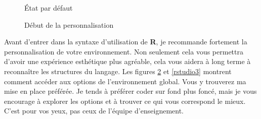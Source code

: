 \documentclass[10.5pt,a4paper]{article}
\begin{document}
\begin{figure}[H]
  \centering
  \caption{État par défaut}
  \label{rstudio1}
\end{figure}

\begin{figure}[H]
  \centering
  \caption{Début de la personnalisation}
  \label{rstudio2}
\end{figure}

Avant d'entrer dans la syntaxe d'utilisation de \textbf{R}, je recommande fortement la personnalisation de votre environnement. Non seulement cela vous permettra d'avoir une expérience esthétique plus agréable, cela vous aidera à long terme à reconnaître les structures du langage. Les figures \ref{rstudio2} et \ref{rstudio3} montrent comment accéder aux options de l'environnement global. Vous y trouverez ma mise en place préférée. Je tends à préférer coder sur fond plus foncé, mais je vous encourage à explorer les options et à trouver ce qui vous correspond le mieux. C'est pour vos yeux, pas ceux de l'équipe d'enseignement. 
\end{document}
